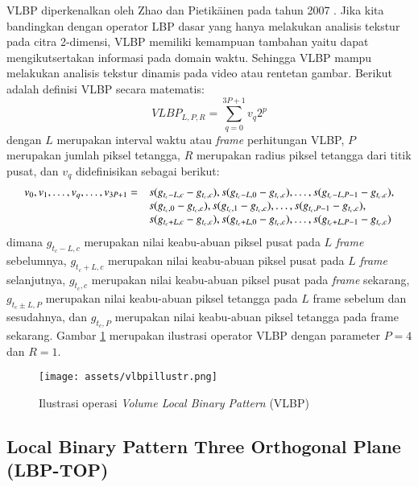 \documentclass[review,3p,12pt,times]{elsarticle}
\begin{document}
VLBP diperkenalkan oleh Zhao dan Pietik\"{a}inen pada tahun 2007 \cite{zhao2007dynamic}. Jika kita bandingkan dengan operator LBP dasar yang hanya melakukan analisis tekstur pada citra 2-dimensi, VLBP memiliki kemampuan tambahan yaitu dapat mengikutsertakan informasi pada domain waktu. Sehingga VLBP mampu melakukan analisis tekstur dinamis pada video atau rentetan gambar. Berikut adalah definisi VLBP secara matematis:
\begin{equation}
VLBP_{L,P,R} = \sum_{q=0}^{3P+1} v_q 2^p
\end{equation}
dengan $L$ merupakan interval waktu atau \textit{frame} perhitungan VLBP, $P$ merupakan jumlah piksel tetangga, $R$ merupakan radius piksel tetangga dari titik pusat, dan $v_q$ didefinisikan sebagai berikut:
\begin{equation}
\begin{array}{l l}
v_0, v_1, \dots, v_q, \dots, v_{3P+1} = & s(g_{t_c-L,c} - g_{t_c,c}), s(g_{t_c-L,0} - g_{t_c,c}), \dots, s(g_{t_c-L,P-1} - g_{t_c,c}),\\
& s(g_{t_c,0} - g_{t_c,c}), s(g_{t_c,1} - g_{t_c,c}), \dots, s(g_{t_c,P-1} - g_{t_c,c}),\\
& s(g_{t_c+L,c} - g_{t_c,c}), s(g_{t_c+L,0} - g_{t_c,c}), \dots, s(g_{t_c+L,P-1} - g_{t_c,c})
\end{array}
\end{equation}
dimana $g_{t_c-L,c}$ merupakan nilai keabu-abuan piksel pusat pada $L$ \textit{frame} sebelumnya, $g_{t_c+L,c}$ merupakan nilai keabu-abuan piksel pusat pada $L$ \textit{frame} selanjutnya, $g_{t_c,c}$ merupakan nilai keabu-abuan piksel pusat pada \textit{frame} sekarang, $g_{t_c \pm L,P}$ merupakan nilai keabu-abuan piksel tetangga pada $L$ frame sebelum dan sesudahnya, dan $g_{t_c,P}$ merupakan nilai keabu-abuan piksel tetangga pada frame sekarang. Gambar \ref{fig:vlbpillustr} merupakan ilustrasi operator VLBP dengan parameter $P = 4$ dan $R = 1$.
\begin{figure}[hbt!]
\caption{Ilustrasi operasi \textit{Volume Local Binary Pattern} (VLBP)}
\label{fig:vlbpillustr}
\centering
	\texttt{[image: assets/vlbpillustr.png]}
	
\end{figure}

\subsection{Local Binary Pattern Three Orthogonal Plane (LBP-TOP)}
\label{lbptop}
\end{document}
